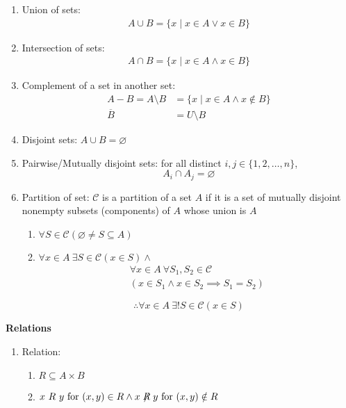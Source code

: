 \documentclass[landscape, a4paper]{article}
\newcommand{\C}{\mathscr{C}}
\newcommand{\Or}{\vee}
\renewcommand{\and}{\wedge}
\newcommand{\heading}[1]{
    \noindent\textbf{#1}
}
\newenvironment{wenumerate}{\begin{enumerate}[wide, labelindent=2pt]}{\end{enumerate}}
\begin{document}
\begin{multicols*}{4}
\begin{wenumerate}
\begin{align*}
        \end{align*}
        \item Union of sets:
        \begin{align*}
            A \cup B=\{x \mid x\in A\Or x\in B\}
        \end{align*}
        \item Intersection of sets:
        \begin{align*}
            A \cap B=\{x\mid x\in A \and x\in B\}
        \end{align*}
        \item Complement of a set in another set:
        \begin{align*}
            A-B=A\setminus B & =\{x\mid x \in A \and x\notin B\} \\
            \overline{B}     & =U\setminus B
        \end{align*}
        \item Disjoint sets: $A\cup B=\varnothing$
        \item Pairwise/Mutually disjoint sets: for all distinct
        $i,j\in\{1,2,\ldots,n\}$,
        \[
            A_i\cap A_j=\varnothing
        \]
        \item Partition of set: $\C$ is a partition of a set $A$ if it is a set of mutually disjoint nonempty subsets (components) of $A$ whose union is $A$
        \begin{enumerate}
            \item $\forall S\in\C(\varnothing\neq S\subseteq A)$
            \item $\forall x \in A\ \exists S \in \C  (x\in S)\and$
                  \begin{multline*}
                      \forall x\in A\ \forall S_1,S_2\in\C \\ (x\in S_1\and x\in S_2 \implies S_1=S_2)
                  \end{multline*}
        \end{enumerate}
        \[
            \therefore \forall x \in A\ \exists ! S\in\C (x\in S)
        \]
    \end{wenumerate}
    \heading{Relations}
    \begin{wenumerate}
        \item Relation:
        \begin{enumerate}
            \item $R\subseteq  A\times B$
            \item $x\ R\ y \text{ for }(x,y)\in R \and x \centernot{R} y \text{ for }(x,y)\notin R$

\end{enumerate}
\end{wenumerate}
\end{multicols*}
\end{document}
